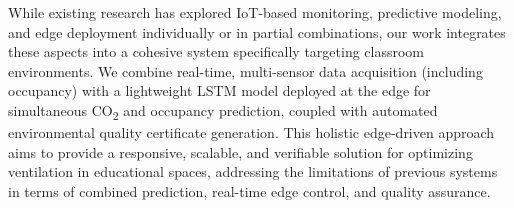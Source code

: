 While existing research has explored IoT-based monitoring, predictive modeling, and edge deployment individually or in partial combinations, our work integrates these aspects into a cohesive system specifically targeting classroom environments. We combine real-time, multi-sensor data acquisition (including occupancy) with a lightweight LSTM model deployed at the edge for simultaneous CO\textsubscript{2} and occupancy prediction, coupled with automated environmental quality certificate generation. This holistic edge-driven approach aims to provide a responsive, scalable, and verifiable solution for optimizing ventilation in educational spaces, addressing the limitations of previous systems in terms of combined prediction, real-time edge control, and quality assurance. 